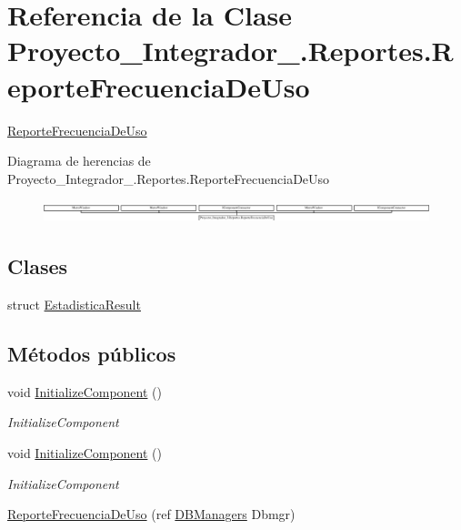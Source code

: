 \hypertarget{class_proyecto___integrador__3_1_1_reportes_1_1_reporte_frecuencia_de_uso}{\section{Referencia de la Clase Proyecto\-\_\-\-Integrador\-\_.\-Reportes.\-Reporte\-Frecuencia\-De\-Uso}
\label{class_proyecto___integrador__3_1_1_reportes_1_1_reporte_frecuencia_de_uso}
}


\hyperlink{class_proyecto___integrador__3_1_1_reportes_1_1_reporte_frecuencia_de_uso}{Reporte\-Frecuencia\-De\-Uso}  


Diagrama de herencias de Proyecto\-\_\-\-Integrador\-\_.\-Reportes.\-Reporte\-Frecuencia\-De\-Uso\begin{figure}[H]
\begin{center}
\leavevmode
\includegraphics[height=0.632768cm]{d5/d69/class_proyecto___integrador__3_1_1_reportes_1_1_reporte_frecuencia_de_uso}
\end{center}
\end{figure}
\subsection*{Clases}
\begin{DoxyCompactItemize}
\item 
struct \hyperlink{struct_proyecto___integrador__3_1_1_reportes_1_1_reporte_frecuencia_de_uso_1_1_estadistica_result}{Estadistica\-Result}
\end{DoxyCompactItemize}
\subsection*{Métodos públicos}
\begin{DoxyCompactItemize}
\item 
void \hyperlink{class_proyecto___integrador__3_1_1_reportes_1_1_reporte_frecuencia_de_uso_ab0c2c9d5584ade92aa8142d2299bfe06}{Initialize\-Component} ()
\begin{DoxyCompactList}\small\item\em Initialize\-Component \end{DoxyCompactList}\item 
void \hyperlink{class_proyecto___integrador__3_1_1_reportes_1_1_reporte_frecuencia_de_uso_ab0c2c9d5584ade92aa8142d2299bfe06}{Initialize\-Component} ()
\begin{DoxyCompactList}\small\item\em Initialize\-Component \end{DoxyCompactList}\item 
\hyperlink{class_proyecto___integrador__3_1_1_reportes_1_1_reporte_frecuencia_de_uso_a6150054e9ff15f176a07d74d892c19a5}{Reporte\-Frecuencia\-De\-Uso} (ref \hyperlink{class_proyecto___integrador__3_1_1_d_b_managers}{D\-B\-Managers} Dbmgr)
\end{DoxyCompactItemize}
